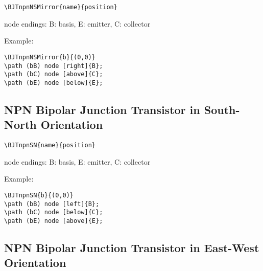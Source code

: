 \documentclass[parskip=full]{scrartcl}
\begin{document}
\begin{verbatim}
\BJTnpnNSMirror{name}{position}
\end{verbatim}
node endings: B: basis, E: emitter, C: collector

Example:\\
\begin{minipage}{0.8\textwidth}
\begin{verbatim}
\BJTnpnNSMirror{b}{(0,0)}
\path (bB) node [right]{B};
\path (bC) node [above]{C};
\path (bE) node [below]{E};
\end{verbatim}
\end{minipage}
\begin{minipage}{0.19\textwidth}
\end{minipage}

\subsection{NPN Bipolar Junction Transistor in South-North Orientation}

\begin{verbatim}
\BJTnpnSN{name}{position}
\end{verbatim}
node endings: B: basis, E: emitter, C: collector

Example:\\
\begin{minipage}{0.8\textwidth}
\begin{verbatim}
\BJTnpnSN{b}{(0,0)}
\path (bB) node [left]{B};
\path (bC) node [below]{C};
\path (bE) node [above]{E};
\end{verbatim}
\end{minipage}
\begin{minipage}{0.19\textwidth}
\end{minipage}

\subsection{NPN Bipolar Junction Transistor in East-West Orientation}
\end{document}
